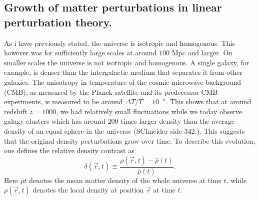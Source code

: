 \subsection{Growth of matter perturbations in linear perturbation theory.}
As i have previously stated, the universe is isotropic and homogenous. This
however was for sufficiently large scales at around $100$ Mpc and larger. On
smaller scales the universe is not isotropic and homogenous. A single galaxy,
for example, is denser than the intergalactic medium that separates it from other
galaxies. The anisotropy in temperature of the cosmic microwave background (CMB), as measured by
the Planck satellite and its predecessor CMB experiments, is measured to be
around $\Delta T/T=10^{-5}$. This shows that at around redshift $z=1000$, we had
relatively small fluctuations while we today observe galaxy clusters which has around
$200$ times larger density than the average density of an equal sphere in the
universe (SChneider side 342.). This suggests that the original density
perturbations grow over time. To describe this evolution, one defines the relative density
contrast as
\begin{equation}
    \delta(\vec{r}, t) \equiv \frac{\rho(\vec{r}, t) - \bar{\rho}(t)}{\bar{\rho}(t)}.
\end{equation}
Here $\bar{\rho}{t}$ denotes the mean matter density of the whole universe at
time $t$, while $\rho(\vec{r}, t)$ denotes the local density at position
$\vec{r}$ at time $t$.\\

